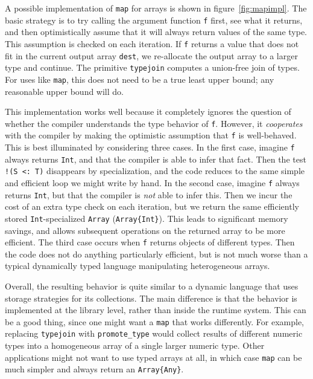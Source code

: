 A possible implementation of \texttt{map} for arrays is shown in
figure~\ref{fig:mapimpl}.
The basic strategy is to try calling the argument function \texttt{f}
first, see what it returns, and then optimistically assume that it
will always return values of the same type.
This assumption is checked on each iteration.
If \texttt{f} returns a value that does not fit in the current output
array \texttt{dest}, we re-allocate the output array to a larger
type and continue.
The primitive \texttt{typejoin} computes a union-free join of types.
For uses like \texttt{map}, this does not need to be a true least
upper bound; any reasonable upper bound will do.

This implementation works well because it completely ignores the
question of whether the compiler understands the type behavior of
\texttt{f}.
However, it \emph{cooperates} with the compiler by making the
optimistic assumption that \texttt{f} is well-behaved.
This is best illuminated by considering three cases.
In the first case, imagine \texttt{f} always returns \texttt{Int},
and that the compiler is able to infer that fact.
Then the test \texttt{!(S <:\ T)} disappears by specialization,
and the code reduces to the same simple and efficient loop we
might write by hand.
In the second case, imagine \texttt{f} always returns \texttt{Int},
but that the compiler is \emph{not} able to infer this.
Then we incur the cost of an extra type check on each iteration,
but we return the same efficiently stored \texttt{Int}-specialized
\texttt{Array} (\texttt{Array\{Int\}}).
This leads to significant memory savings, and allows subsequent
operations on the returned array to be more efficient.
The third case occurs when \texttt{f} returns objects of different
types.
Then the code does not do anything particularly efficient, but is
not much worse than a typical dynamically typed language manipulating
heterogeneous arrays.

Overall, the resulting behavior is quite similar to a dynamic
language that uses storage strategies \cite{Bolz2013} for its
collections.
The main difference is that the behavior is implemented at the
library level, rather than inside the runtime system.
This can be a good thing, since one might want a \texttt{map} that
works differently.
For example, replacing \texttt{typejoin} with \texttt{promote\_type}
would collect results of different numeric types into a
homogeneous array of a single larger numeric type.
Other applications might not want to use typed arrays at all, in
which case \texttt{map} can be much simpler and always return an
\texttt{Array\{Any\}}.

